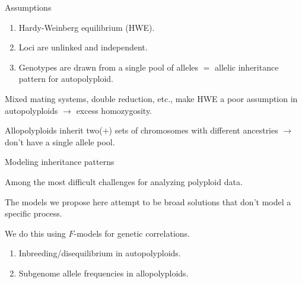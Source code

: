 \documentclass[presentation,sansserif,12pt]{beamer}
\begin{document}
\begin{frame}[t]{Assumptions}

  \begin{enumerate}
    \setlength\itemsep{0.25in}
    \item Hardy-Weinberg equilibrium (HWE).
    \item Loci are unlinked and independent.
    \item Genotypes are drawn from a single pool of alleles $=$ allelic inheritance pattern for autopolyploid.
  \end{enumerate}
  \vspace{0.25in}
  \pause

Mixed mating systems, double reduction, etc., make HWE a poor assumption in autopolyploids \pause $\rightarrow$ excess homozygosity.
\vspace{0.25in}
\pause

Allopolyploids inherit two($+$) sets of chromosomes with different ancestries \pause $\rightarrow$ don't have a single allele pool.

\end{frame}

\begin{frame}[t]{Modeling inheritance patterns}
\vspace{0.2in}
\pause

  Among the most difficult challenges for analyzing polyploid data.
  \vspace{0.3in}
  \pause
  
  The models we propose here attempt to be broad solutions that don't model a specific process.
  \vspace{0.3in}
  \pause
  
  We do this using $F$-models for genetic correlations.
  \vspace{0.3in}
  \pause
  
  	\begin{enumerate}
		\item Inbreeding/disequilibrium in autopolyploids.
		\item Subgenome allele frequencies in allopolyploids.
	\end{enumerate}

\end{frame}
\end{document}
